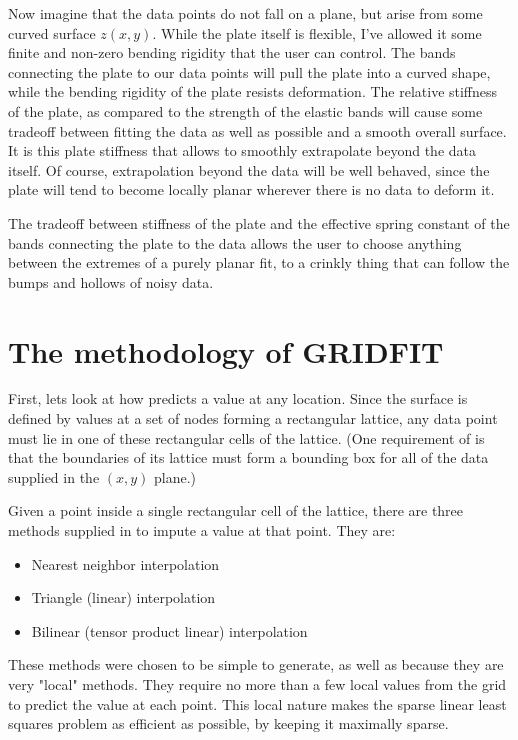 \documentclass[a4paper,11pt]{article}
\newcommand{\G}{\mcode{GRIDFIT}}
\begin{document}
Now imagine that the data points do not fall on a plane, but arise
from some curved surface $z(x,y)$. While the plate itself is
flexible, I've allowed it some finite and non-zero bending rigidity
that the user can control. The bands connecting the plate to our
data points will pull the plate into a curved shape, while the
bending rigidity of the plate resists deformation. The relative
stiffness of the plate, as compared to the strength of the elastic
bands will cause some tradeoff between fitting the data as well as
possible and a smooth overall surface. It is this plate stiffness
that allows \G{} to smoothly extrapolate beyond the data itself. Of
course, extrapolation beyond the data will be well behaved, since
the plate will tend to become locally planar wherever there is no
data to deform it.

The tradeoff between stiffness of the plate and the effective spring
constant of the bands connecting the plate to the data allows the
user to choose anything between the extremes of a purely planar fit,
to a crinkly thing that can follow the bumps and hollows of noisy
data.


\section{The methodology of GRIDFIT}

First, lets look at how \G{} predicts a value at any location. Since
the \G{} surface is defined by values at a set of nodes forming a
rectangular lattice, any data point must lie in one of these
rectangular cells of the lattice. (One requirement of \G{} is that
the boundaries of its lattice must form a bounding box for all of
the data supplied in the $(x,y)$ plane.)

Given a point inside a single rectangular cell of the lattice, there
are three methods supplied in \G{} to impute a value at that point.
They are:
\begin{itemize}
  \item Nearest neighbor interpolation
  \item Triangle (linear) interpolation
  \item Bilinear (tensor product linear) interpolation
\end{itemize}

These methods were chosen to be simple to generate, as well as
because they are very "local" methods.  They require no more than a
few local values from the grid to predict the value at each point.
This local nature makes the sparse linear least squares problem as
efficient as possible, by keeping it maximally sparse.
\end{document}
